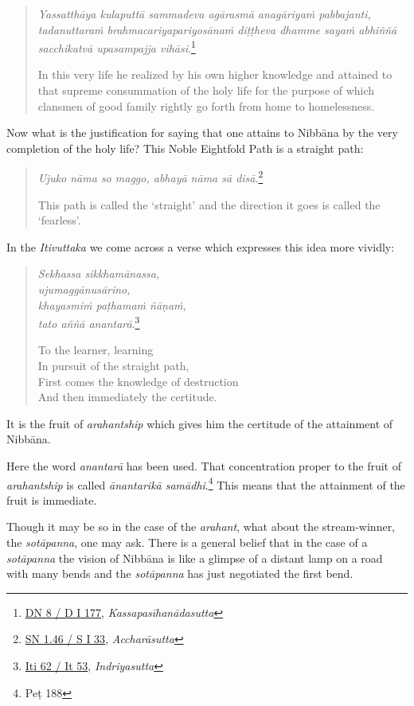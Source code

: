 \begin{quote}
\emph{Yassatthāya kulaputtā sammadeva agārasmā anagāriyaṁ pabbajanti, tadanuttaraṁ brahmacariyapariyosānaṁ diṭṭheva dhamme sayaṁ abhiññā sacchikatvā upasampajja vihāsi}.\footnote{\href{https://suttacentral.net/dn8/pli/ms}{DN 8 / D I 177}, \emph{Kassapasīhanādasutta}}

In this very life he realized by his own higher knowledge and attained to that supreme consummation of the holy life for the purpose of which clansmen of good family rightly go forth from home to homelessness.
\end{quote}

Now what is the justification for saying that one attains to Nibbāna by the very completion of the holy life? This Noble Eightfold Path is a straight path:

\begin{quote}
\emph{Ujuko nāma so maggo, abhayā nāma sā disā}.\footnote{\href{https://suttacentral.net/sn1.46/pli/ms}{SN 1.46 / S I 33}, \emph{Accharāsutta}}

This path is called the `straight' and the direction it goes is called the `fearless'.
\end{quote}

In the \emph{Itivuttaka} we come across a verse which expresses this idea more vividly:

\begin{quote}
\emph{Sekhassa sikkhamānassa,}\\
\emph{ujumaggānusārino,}\\
\emph{khayasmiṁ paṭhamaṁ ñāṇaṁ,}\\
\emph{tato aññā anantarā}.\footnote{\href{https://suttacentral.net/iti62/pli/ms}{Iti 62 / It 53}, \emph{Indriyasutta}}

To the learner, learning\\
In pursuit of the straight path,\\
First comes the knowledge of destruction\\
And then immediately the certitude.
\end{quote}

It is the fruit of \emph{arahantship} which gives him the certitude of the attainment of Nibbāna.

Here the word \emph{anantarā} has been used. That concentration proper to the fruit of \emph{arahantship} is called \emph{ānantarikā samādhi}.\footnote{Peṭ 188} This means that the attainment of the fruit is immediate.

Though it may be so in the case of the \emph{arahant}, what about the stream-winner, the \emph{sotāpanna}, one may ask. There is a general belief that in the case of a \emph{sotāpanna} the vision of Nibbāna is like a glimpse of a distant lamp on a road with many bends and the \emph{sotāpanna} has just negotiated the first bend.

